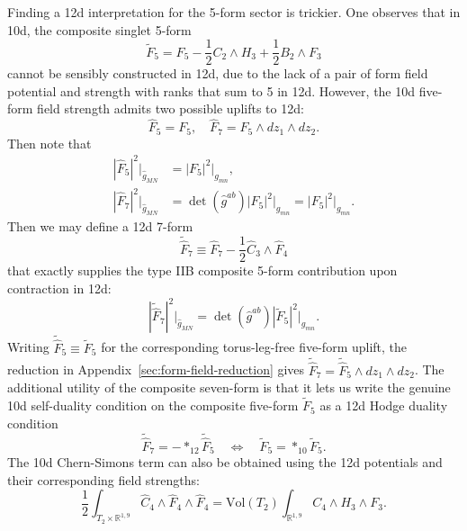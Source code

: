 Finding a 12d interpretation for the 5-form sector is trickier. 
One observes that in 10d, the composite \SLR{} singlet 5-form 
\begin{equation}
\tilde F_5 = F_5 - \frac12 C_2 \wedge H_3 + \frac{1}{2}B_2\wedge F_3    
\end{equation}
cannot be sensibly constructed in 12d, due to the lack of a pair of form field potential and strength with ranks that sum to 5 in 12d.
However, the 10d five-form field strength admits two possible uplifts to 12d:
\begin{equation}
\widehat{F}_5 = F_5,\quad \widehat{F}_7=F_5\wedge dz_1 \wedge dz_2.
\end{equation}
Then note that
\begin{equation}
\begin{aligned}
|\widehat{F}_5|^2\bigg|_{\widehat{g}_{MN}} 
&= |F_5|^2\bigg|_{g_{mn}},\\
|\widehat{F}_7|^2\bigg|_{\widehat{g}_{MN}}
&=\det(\widehat{g}^{ab})|F_5|^2\bigg|_{g_{mn}} = |F_5|^2\bigg|_{g_{mn}}.
\end{aligned}
\end{equation}
Then we may define a 12d 7-form
\begin{equation}
\widetilde{\widehat{F}}_7 \equiv \widehat{F}_7 - \frac{1}{2}\widehat{C}_3 \wedge \widehat{F}_4
\end{equation}
that exactly supplies the type IIB composite 5-form contribution upon contraction in 12d:
\begin{equation}
|\widetilde{\widehat{F}}_7|^2\bigg|_{\widehat{g}_{MN}} =
\det(\widehat{g}^{ab})|\tilde F_5|^2\bigg|_{g_{mn}}.
\end{equation}
Writing $\widetilde{\widehat{F}}_5\equiv\tilde F_5$ for the corresponding torus-leg-free five-form uplift, the reduction in Appendix~\ref{sec:form-field-reduction} gives $\widetilde{\widehat{F}}_7=\widetilde{\widehat{F}}_5\wedge dz_1\wedge dz_2$.
The additional utility of the composite seven-form is that it lets us write the genuine 10d self-duality condition on the composite five-form $\tilde F_5$ as a 12d Hodge duality condition
\begin{equation}
\widetilde{\widehat{F}}_7 = -*_{12}\widetilde{\widehat{F}}_5\quad
\Leftrightarrow\quad
\tilde F_5 = *_{10}\tilde F_5.
\label{12d interpretation of 10d self-duality}
\end{equation}
The 10d Chern-Simons term can also be obtained using the 12d potentials and their corresponding field strengths:
\begin{equation}
\frac{1}{2}\int_{T_2\times \mathbb{R}^{1,9}} \widehat{C}_4\wedge \widehat{F}_4\wedge\widehat{F}_4=
\mathrm{Vol}(T_2)\int_{\mathbb{R}^{1,9}}C_4\wedge H_3\wedge F_3.
\end{equation}
